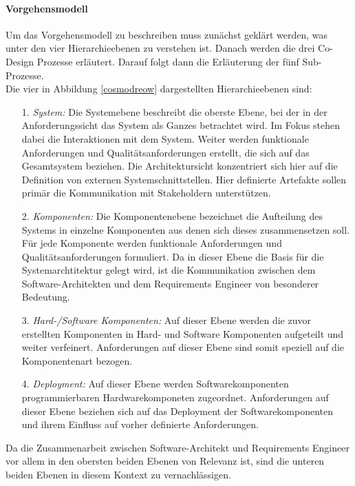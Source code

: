 \paragraph{Vorgehensmodell}
Um das Vorgehensmodell zu beschreiben muss zun\"achst gekl\"art werden, was unter den vier Hierarchieebenen zu verstehen ist. Danach werden die drei Co-Design Prozesse erl\"autert. Darauf folgt dann die Erl\"auterung der f\"unf Sub-Prozesse.\\

Die vier in Abbildung \ref{cosmodreow} dargestellten Hierarchieebenen sind:\\

\begin{itemize}
\item[1.] \emph{System:} Die Systemebene beschreibt die oberste Ebene, bei der in der Anforderungssicht das System als Ganzes betrachtet wird. Im Fokus stehen dabei die Interaktionen mit dem System. Weiter werden funktionale Anforderungen und Qualit\"atsanforderungen erstellt, die sich auf das Gesamtsystem beziehen. Die Architektursicht konzentriert sich hier auf die Definition von externen Systemschnittstellen. Hier definierte Artefakte sollen prim\"ar die Kommunikation mit Stakeholdern unterst\"utzen.
\item[2.] \emph{Komponenten:} Die Komponentenebene bezeichnet die Aufteilung des Systems in einzelne Komponenten aus denen sich dieses zusammensetzen soll. F\"ur jede Komponente werden funktionale Anforderungen und Qualit\"atsanforderungen formuliert. Da in dieser Ebene die Basis f\"ur die Systemarchtitektur gelegt wird, ist die Kommunikation zwischen dem Software-Architekten und dem Requirements Engineer von besonderer Bedeutung. 
\item[3.] \emph{Hard-/Software Komponenten:} Auf dieser Ebene werden die zuvor erstellten Komponenten in Hard- und Software Komponenten aufgeteilt und weiter verfeinert. Anforderungen auf dieser Ebene sind somit speziell auf die Komponentenart bezogen. 
\item[4.] \emph{Deployment:} Auf dieser Ebene werden Softwarekomponenten programmierbaren Hardwarekomponeten zugeordnet. Anforderungen auf dieser Ebene beziehen sich auf das Deployment der Softwarekomponenten und ihrem Einfluss auf vorher definierte Anforderungen. \\
\end{itemize}
Da die Zusammenarbeit zwischen Software-Architekt und Requirements Engineer vor allem in den obersten beiden Ebenen von Relevanz ist, sind die unteren beiden Ebenen in diesem Kontext zu vernachl\"assigen.\\

